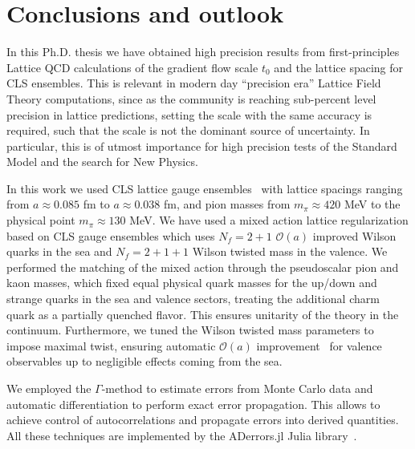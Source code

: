 \chapter*{Conclusions and outlook}
\label{ch_conclu}

In this Ph.D. thesis we have obtained high precision results from first-principles Lattice QCD calculations of the gradient flow scale $t_0$ and the lattice spacing for CLS ensembles. This is relevant in modern day ``precision era'' Lattice Field Theory computations, since as the community is reaching sub-percent level precision in lattice predictions, setting the scale with the same accuracy is required, such that the scale is not the dominant source of uncertainty. In particular, this is of utmost importance for high precision tests of the Standard Model and the search for New Physics.

In this work we used CLS lattice gauge ensembles~\citep{Bruno:2014jqa,Mohler:2017wnb} with lattice spacings ranging from $a\approx0.085$ fm to $a\approx0.038$ fm, and pion masses from $m_{\pi}\approx420$ MeV to the physical point $m_{\pi}\approx130$ MeV. We have used a mixed action lattice regularization based on CLS gauge ensembles which uses $N_f=2+1$ $\mathcal{O}(a)$ improved Wilson quarks in the sea and $N_f=2+1+1$ Wilson twisted mass in the valence. We performed the matching of the mixed action through the pseudoscalar pion and kaon masses, which fixed equal physical quark masses for the up/down and strange quarks in the sea and valence sectors, treating the additional charm quark as a partially quenched flavor. This ensures unitarity of the theory in the continuum. Furthermore, we tuned the Wilson twisted mass parameters to impose maximal twist, ensuring automatic $\mathcal{O}(a)$ improvement~\citep{Frezzotti:2003ni,Shindler:2007vp} for valence observables up to negligible effects coming from the sea.

We employed the $\Gamma$-method to estimate errors from Monte Carlo data and automatic differentiation to perform exact error propagation. This allows to achieve control of autocorrelations and propagate errors into derived quantities. All these techniques are implemented by the ADerrors.jl Julia library~\citep{Ramos:2018vgu,Ramos:2020scv}. 

